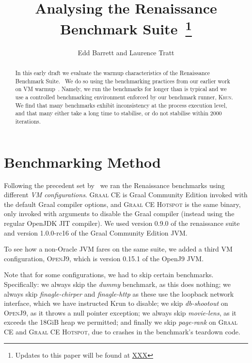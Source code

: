 \documentclass[a4paper]{article}
\newcommand{\krun}{\textsc{Krun}\xspace}
\newcommand{\graalce}{\textsc{Graal CE}\xspace}
\newcommand{\graalcehs}{\textsc{Graal CE Hotspot}\xspace}
\newcommand{\jnine}{\textsc{OpenJ9}\xspace}
\begin{document}
\title{Analysing the Renaissance Benchmark Suite~\footnote{Updates to this paper will be found at \url{XXX}}}

\author{Edd Barrett and Laurence Tratt}

\maketitle

\begin{abstract}
\noindent In this early draft we evaluate the warmup characteristics of the
Renaissance Benchmark Suite.~\cite{prokopec19renaissance} We do so using the
benchmarking practices from our earlier work on VM
warmup~\cite{barrett16warmup}. Namely, we run the benchmarks for longer than is
typical and we use a controlled benchmarking environment enforced by our
benchmark runner, \krun. We find that many benchmarks exhibit inconsistency at
the process execution level, and that many either take a long time to
stabilise, or do not stabilise within 2000 iterations.
\end{abstract}

\section{Benchmarking Method}
\label{sec:eval}

Following the precedent set by~\cite{prokopec19renaissance} we ran the
Renaissance benchmarks using different \emph{VM configurations}. \graalce is
Graal Community Edition invoked with the default Graal compiler options, and
\graalcehs is the same binary, only invoked with arguments to disable the Graal
compiler (instead using the regular OpenJDK JIT compiler). We used version 0.9.0
of the renaissance suite and version 1.0.0-rc16 of the Graal Community
Edition JVM.

To see how a non-Oracle JVM fares on the same suite, we added a third VM
configuration, \jnine, which is version 0.15.1 of the OpenJ9 JVM.

Note that for some configurations, we had to skip certain benchmarks.
Specifically: we always skip the \emph{dummy} benchmark, as this does nothing;
we always skip \emph{finagle-chirper} and \emph{finagle-http} as these use the
loopback network interface, which we have instructed Krun to disable; we skip
\emph{db-shootout} on \jnine, as it throws a null pointer exception; we always
skip \emph{movie-lens}, as it exceeds the 18GiB heap we permitted; and finally
we skip \emph{page-rank} on \graalce and \graalcehs, due to crashes in the
benchmark's teardown code.
\end{document}
